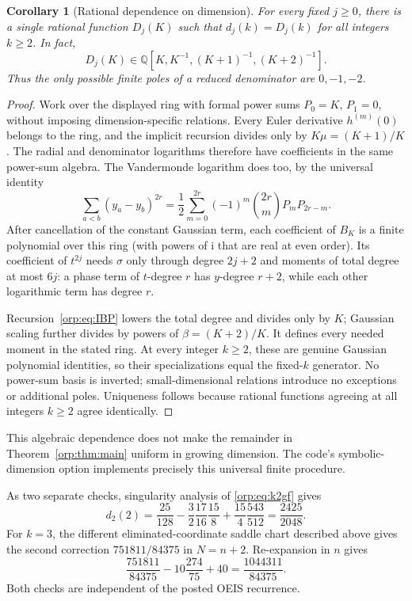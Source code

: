 \documentclass[11pt]{article}
\newtheorem{corollary}[theorem]{Corollary}
\theoremstyle{remark}\newtheorem{remark}[theorem]{Remark}
\newcommand{\ii}{\mathrm i}
\begin{document}
\begin{corollary}[Rational dependence on dimension]\label{orp:cor:rationaldimension}
For every fixed $j\ge0$, there is a single rational function $D_j(K)$ such that $d_j(k)=D_j(k)$ for all integers $k\ge2$. In fact,
\[
 D_j(K)\in\mathbb Q[K,K^{-1},(K+1)^{-1},(K+2)^{-1}].
\]
Thus the only possible finite poles of a reduced denominator are $0,-1,-2$.
\end{corollary}
\begin{proof}
Work over the displayed ring with formal power sums $P_0=K$, $P_1=0$, without imposing dimension-specific relations. Every Euler derivative $h^{(m)}(0)$ belongs to the ring, and the implicit recursion divides only by $K\mu=(K+1)/K$. The radial and denominator logarithms therefore have coefficients in the same power-sum algebra. The Vandermonde logarithm does too, by the universal identity
\[
 \sum_{a<b}(y_a-y_b)^{2r}=\frac12\sum_{m=0}^{2r}(-1)^m\binom{2r}{m}P_mP_{2r-m}.
\]
After cancellation of the constant Gaussian term, each coefficient of $B_K$ is a finite polynomial over this ring (with powers of $\ii$ that are real at even order). Its coefficient of $t^{2j}$ needs $\sigma$ only through degree $2j+2$ and moments of total degree at most $6j$: a phase term of $t$-degree $r$ has $y$-degree $r+2$, while each other logarithmic term has degree $r$.

Recursion~\eqref{orp:eq:IBP} lowers the total degree and divides only by $K$; Gaussian scaling further divides by powers of $\beta=(K+2)/K$. It defines every needed moment in the stated ring. At every integer $k\ge2$, these are genuine Gaussian polynomial identities, so their specializations equal the fixed-$k$ generator. No power-sum basis is inverted; small-dimensional relations introduce no exceptions or additional poles. Uniqueness follows because rational functions agreeing at all integers $k\ge2$ agree identically.
\end{proof}
This algebraic dependence does not make the remainder in Theorem~\ref{orp:thm:main} uniform in growing dimension. The code's symbolic-dimension option implements precisely this universal finite procedure.

As two separate checks, singularity analysis of \eqref{orp:eq:k2gf} gives
\[
 d_2(2)=\frac{25}{128}-\frac32\frac{17}{16}\frac{15}{8}
                         +\frac{15}{4}\frac{543}{512}=\frac{2425}{2048}.
\]
For $k=3$, the different eliminated-coordinate saddle chart described above gives the second correction $751811/84375$ in $N=n+2$. Re-expansion in $n$ gives
\[
 \frac{751811}{84375}-10\frac{274}{75}+40=\frac{1044311}{84375}.
\]
Both checks are independent of the posted OEIS recurrence.
\end{document}
